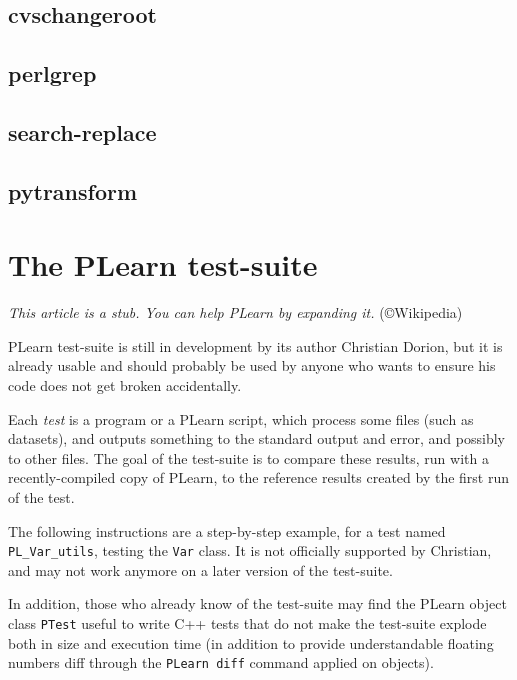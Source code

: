 \documentclass[11pt]{book}
\begin{document}
\section{cvschangeroot}

\section{perlgrep}

\section{search-replace}

\section{pytransform}


\chapter{The PLearn test-suite }

{\em This article is a stub. You can help PLearn by expanding it.}
(\copyright Wikipedia)

PLearn test-suite is still in development by its author Christian
Dorion, but it is already usable and should probably be used by anyone
who wants to ensure his code does not get broken accidentally.

Each {\em test} is a program or a PLearn script, which process some
files (such as datasets), and outputs something to the standard output
and error, and possibly to other files. The goal of the test-suite is to
compare these results, run with a recently-compiled copy of PLearn, to
the reference results created by the first run of the test.

The following instructions are a step-by-step example, for a test named
{\tt PL\_Var\_utils}, testing the {\tt Var} class. It is not officially
supported by Christian, and may not work anymore on a later version of
the test-suite.

In addition, those who already know of the test-suite may find the
PLearn object class {\tt PTest} useful to write C++ tests that do not
make the test-suite explode both in size and execution time (in addition
to provide understandable floating numbers diff through the {\tt PLearn
diff} command applied on objects).
\end{document}
